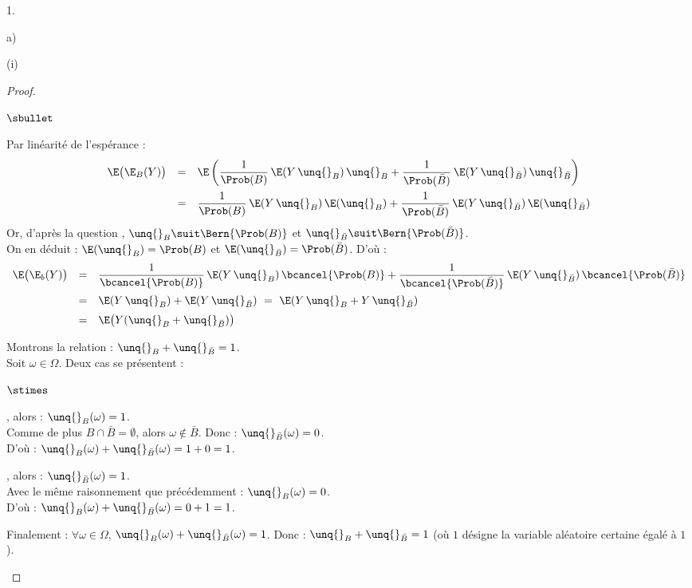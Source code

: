 \documentclass[11pt]{article}%
\begin{document}
\begin{noliste}{1.}
\begin{noliste}{a)}
\begin{nonoliste}{(i)}
\begin{proof}
\begin{noliste}{$\sbullet$}
	  \item Par linéarité de l'espérance :
	  \[
	    \begin{array}{rcl}
	      \E\big(\E_B(Y)\big) &=& \E\left( \dfrac{1}{\Prob(B)}
	      \, \E(Y \, \unq{}_B) \, \unq{}_B + 
	      \dfrac{1}{\Prob(\bar{B})} \, \E(Y \, \unq{}_{\bar{B}})
	      \, \unq{}_{\bar{B}}\right)
	      \\[.4cm]
	      &=& \dfrac{1}{\Prob(B)} \, \E(Y \, \unq{}_B) \, 
	      \E(\unq{}_B) + \dfrac{1}{\Prob(\bar{B})} \, \E(Y \,
	      \unq{}_{\bar{B}}) \, \E(\unq{}_{\bar{B}})
	    \end{array}
	  \]
	  Or, d'après la question , $\unq{}_B \suit
	  \Bern{\Prob(B)}$ et $\unq{}_{\bar{B}} \suit \Bern{\Prob(
	  \bar{B})}$.\\
	  On en déduit : $\E(\unq{}_B) = \Prob(B)$ et $\E(\unq{}_{
	  \bar{B}}) = \Prob(\bar{B})$. D'où :
	  \[
	    \begin{array}{rcl}
	      \E\big(\E_b(Y)\big) &=& \dfrac{1}{\bcancel{\Prob(B)}}
	      \, \E(Y \, \unq{}_B) \, \bcancel{\Prob(B)} + 
	      \dfrac{1}{\bcancel{\Prob(\bar{B})}} \, \E(Y \,
	      \unq{}_{\bar{B}}) \, \bcancel{\Prob(\bar{B})}
	      \\[.4cm]
	      &=& \E(Y \, \unq{}_B) + \E(Y \, \unq{}_{\bar{B}})
	      \ = \ \E(Y \, \unq{}_B + Y \, \unq{}_{\bar{B}})
	      \\[.2cm]
	      &=& \E\big(Y(\unq{}_B + \unq{}_{\bar{B}})\big)
	    \end{array}
	  \]
	  
	  \item Montrons la relation : $\unq{}_B + \unq{}_{\bar{B}}
	  =1$.\\
	  Soit $\omega \in \Omega$. Deux cas se présentent :
	  \end{noliste}
	  \begin{liste}{$\stimes$}
	    \item {}, alors : $\unq{}_B
	    (\omega)=1$.\\
	    Comme de plus $B \cap \bar{B} = \emptyset$, alors 
	    $\omega \notin \bar{B}$. Donc : $\unq{}_{\bar{B}}
	    (\omega)=0$.\\
	    D'où : $\unq{}_B(\omega) + \unq{}_{\bar{B}}(\omega) =
	    1+0=1$.
	    
	    
	    \newpage
	    
	    
	    \item {}, alors : 
	    $\unq{}_{\bar{B}}(\omega) = 1$.\\
	    Avec le même raisonnement que précédemment : $\unq{}_B
	    (\omega) =0$.\\
	    D'où : $\unq{}_B(\omega) + \unq{}_{\bar{B}}(\omega) = 
	    0+1=1$.
	  \end{liste}
	  \begin{noliste}{}
	  \item Finalement : $\forall \omega \in \Omega$, 
	  $\unq{}_B(\omega)
	  + \unq{}_{\bar{B}}(\omega) = 1$. Donc : $\unq{}_B + 
	  \unq{}_{\bar{B}} = 1$ (où $1$ désigne la variable 
	  aléatoire certaine égalé à $1$).
	  

\end{noliste}
\end{proof}
\end{nonoliste}
\end{noliste}
\end{noliste}
\end{document}
